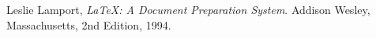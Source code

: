 \documentclass[utf8]{report}
\begin{document}
\begin{thebibliography}{9}
      Leslie Lamport,
      \emph{\LaTeX: A Document Preparation System}.
      Addison Wesley, Massachusetts,
      2nd Edition,
      1994.
 
\end{thebibliography}
 
\end{document}
